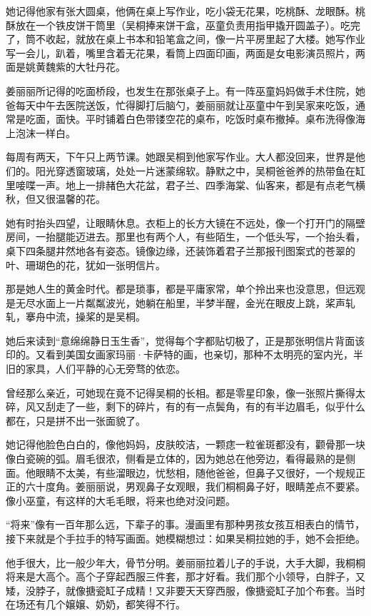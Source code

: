 \documentclass[lang=cn,newtx,12pt,scheme=chinese]{elegantbook}
\begin{document}
她记得他家有张大圆桌，他俩在桌上写作业，吃小袋无花果，吃桃酥、龙眼酥。桃酥放在一个铁皮饼干筒里（吴桐捧来饼干盒，巫童负责用指甲撬开圆盖子）。吃完了，筒不收起，就放在桌上书本和铅笔盒之间，像一片平房里起了大楼。她写作业写一会儿，趴着，嘴里含着无花果，看筒上四面印画，两面是女电影演员照片，两面是姚黄魏紫的大牡丹花。

姜丽丽所记得的吃面桥段，也发生在那张桌子上。有一阵巫童妈妈做手术住院，她爸每天中午去医院送饭，忙得脚打后脑勺，姜丽丽就让巫童中午到吴家来吃饭，通常是吃面，面快。平时铺着白色带镂空花的桌布，吃饭时桌布撤掉。桌布洗得像海上泡沫一样白。

每周有两天，下午只上两节课。她跟吴桐到他家写作业。大人都没回来，世界是他们的。阳光穿透窗玻璃，处处一片迷蒙绵软。静默之中，吴桐爸爸养的热带鱼在缸里唼喋一声。地上一排赭色大花盆，君子兰、四季海棠、仙客来，都是有点老气横秋，但又很温馨的花。

她有时抬头四望，让眼睛休息。衣柜上的长方大镜在不远处，像一个打开门的隔壁房间，一抬腿能迈进去。那里也有两个人，有些陌生，一个低头写，一个抬头看，桌下四条腿井然地各有姿态。镜像边缘，还装饰着君子兰那报刊图案式的苍翠的叶、珊瑚色的花，犹如一张明信片。

那是她人生的黄金时代。都是琐事，都是平庸家常，单个拎出来也没意思，但远观是无尽水面上一片粼粼波光，她躺在船里，半梦半醒，金光在眼皮上跳，桨声轧轧，搴舟中流，操桨的是吴桐。

她后来读到“意绵绵静日玉生香”，觉得每个字都贴切极了，正是那张明信片背面该印的。又看到美国女画家玛丽·卡萨特的画，也亲切，那种不太明亮的室内光，半旧的家具，人们平静的心无旁骛的依恋。

曾经那么亲近，可她现在竟不记得吴桐的长相。都是零星印象，像一张照片撕得太碎，风又刮走了一些，剩下的碎片，有的有一点鬓角，有的有半边眉毛，似乎什么都在，只是拼不出一张面貌了。

她记得他脸色白白的，像他妈妈，皮肤皎洁，一颗痣一粒雀斑都没有，颧骨那一块像白瓷碗的弧。眉毛很浓，侧看是立体的，因为她总在他旁边，看得最熟的是侧面。他眼睛不太美，有些溜眼边，忧愁相，随他爸爸，但鼻子又很好，一个规规正正的六十度角。姜丽丽说，男观鼻子女观眼，我们桐桐鼻子好，眼睛差点不要紧。像小巫童，有这样的大毛毛眼，将来也绝对没问题。

“将来”像有一百年那么远，下辈子的事。漫画里有那种男孩女孩互相表白的情节，接下来就是个手拉手的特写画面。她模糊想过：如果吴桐拉她的手，她不会拒绝。

他手很大，比一般少年大，骨节分明。姜丽丽拉着儿子的手说，大手大脚，我桐桐将来是大高个。高个子穿起西服三件套，那才好看。我们那个小领导，白胖子，又矮，没脖子，就像搪瓷缸子成精！又非要天天穿西服，像搪瓷缸子加个布套。当时在场还有几个嬢嬢、奶奶，都笑得不行。
\end{document}
